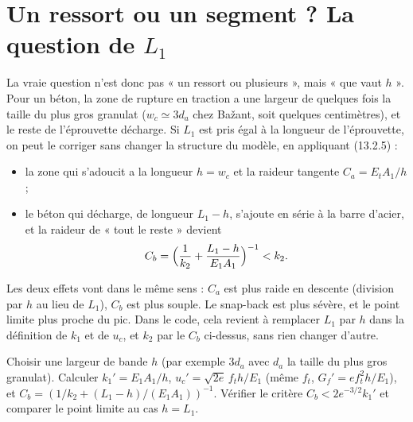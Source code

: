 \documentclass[11pt,a4paper]{article}
\newcommand{\uc}{u_c}
\begin{document}
\section{Un ressort ou un segment ? La question de $L_1$}
La vraie question n'est donc pas « un ressort ou plusieurs », mais « que vaut $h$ ». Pour un
béton, la zone de rupture en traction a une largeur de quelques fois la taille du plus gros
granulat ($w_c \simeq 3d_a$ chez Bažant, soit quelques centimètres), et le reste de l'éprouvette
décharge. Si $L_1$ est pris égal à la longueur de l'éprouvette, on peut le corriger sans
changer la structure du modèle, en appliquant (13.2.5) :
\begin{itemize}[nosep]
  \item la zone qui s'adoucit a la longueur $h = w_c$ et la raideur tangente $C_a = E_tA_1/h$ ;
  \item le béton qui décharge, de longueur $L_1 - h$, s'ajoute en série à la barre d'acier, et
        la raideur de « tout le reste » devient
        \begin{equation}
          C_b = \Bigl(\frac1{k_2} + \frac{L_1 - h}{E_1A_1}\Bigr)^{-1} < k_2 .
        \end{equation}
\end{itemize}
Les deux effets vont dans le même sens : $C_a$ est plus raide en descente (division par $h$
au lieu de $L_1$), $C_b$ est plus souple. Le snap-back est plus sévère, et le point limite
plus proche du pic. Dans le code, cela revient à remplacer $L_1$ par $h$ dans la définition de
$k_1$ et de $\uc$, et $k_2$ par le $C_b$ ci-dessus, sans rien changer d'autre.

\begin{alamain}
Choisir une largeur de bande $h$ (par exemple $3d_a$ avec $d_a$ la taille du plus gros
granulat). Calculer $k_1' = E_1A_1/h$, $\uc' = \sqrt{2e}\,f_th/E_1$ (même $f_t$, $G_f' = ef_t^2h/E_1$),
et $C_b = (1/k_2 + (L_1-h)/(E_1A_1))^{-1}$. Vérifier le critère $C_b < 2e^{-3/2}k_1'$ et comparer
le point limite au cas $h = L_1$.
\end{alamain}
\end{document}
